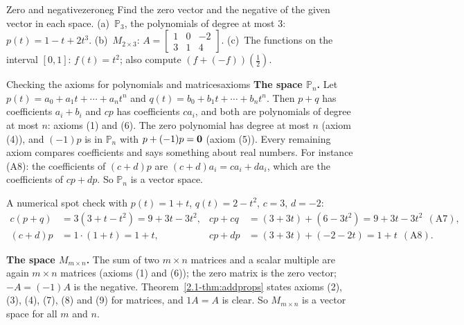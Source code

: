 \documentclass[11pt]{article}
\begin{document}
\begin{kc}{Zero and negative}{zeroneg}
Find the zero vector and the negative of the given vector in each space. (a)~$\mathbb{P}_3$, the polynomials of degree at most $3$: $p(t)=1-t+2t^3$. (b)~$M_{2\times3}$: $A=\begin{bmatrix}1&0&-2\\3&1&4\end{bmatrix}$. (c)~The functions on the interval $[0,1]$: $f(t)=t^2$; also compute $(f+(-f))(\tfrac12)$.
\end{kc}

\begin{exmp}{Checking the axioms for polynomials and matrices}{axioms}
\textbf{The space $\mathbb{P}_n$.} Let $p(t)=a_0+a_1t+\cdots+a_nt^n$ and $q(t)=b_0+b_1t+\cdots+b_nt^n$. Then $p+q$ has coefficients $a_i+b_i$ and $cp$ has coefficients $ca_i$, and both are polynomials of degree at most $n$: axioms (1) and (6). The zero polynomial has degree at most $n$ (axiom (4)), and $(-1)p$ is in $\mathbb{P}_n$ with $p+(-1)p=\mathbf{0}$ (axiom (5)). Every remaining axiom compares coefficients and says something about real numbers. For instance (A8): the coefficients of $(c+d)p$ are $(c+d)a_i=ca_i+da_i$, which are the coefficients of $cp+dp$. So $\mathbb{P}_n$ is a vector space.

A numerical spot check with $p(t)=1+t$, $q(t)=2-t^2$, $c=3$, $d=-2$:
\begin{align*}
c(p+q)&=3(3+t-t^2)=9+3t-3t^2, & cp+cq&=(3+3t)+(6-3t^2)=9+3t-3t^2\ \ (\text{A7}),\\
(c+d)p&=1\cdot(1+t)=1+t, & cp+dp&=(3+3t)+(-2-2t)=1+t\ \ (\text{A8}).
\end{align*}

\textbf{The space $M_{m\times n}$.} The sum of two $m\times n$ matrices and a scalar multiple are again $m\times n$ matrices (axioms (1) and (6)); the zero matrix is the zero vector; $-A=(-1)A$ is the negative. Theorem~\ref{2.1-thm:addprops} states axioms (2), (3), (4), (7), (8) and (9) for matrices, and $1A=A$ is clear. So $M_{m\times n}$ is a vector space for all $m$ and $n$.
\end{exmp}
\end{document}
